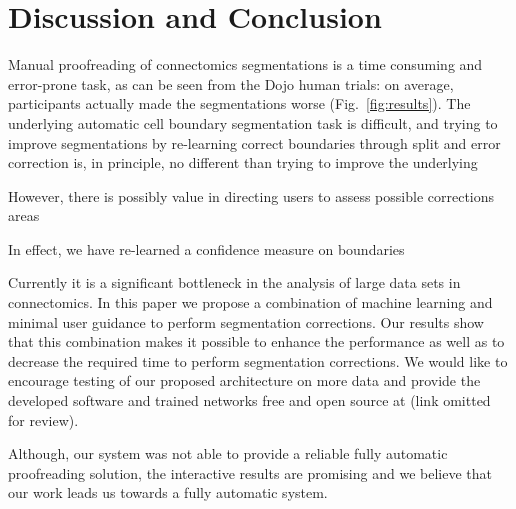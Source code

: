 \section{Discussion and Conclusion}

Manual proofreading of connectomics segmentations is a time consuming and error-prone task, as can be seen from the Dojo human trials: on average, participants actually made the segmentations worse (Fig.~\ref{fig:results}). The underlying automatic cell boundary segmentation task is difficult, and trying to improve segmentations by re-learning correct boundaries through split and error correction is, in principle, no different than trying to improve the underlying 

However, there is possibly value in directing users to assess possible corrections areas

In effect, we have re-learned a confidence measure on boundaries 


Currently it is a significant bottleneck in the analysis of large data sets in connectomics. In this paper we propose a combination of machine learning and minimal user guidance to perform segmentation corrections. Our results show that this combination makes it possible to enhance the performance as well as to decrease the required time to perform segmentation corrections. We would like to encourage testing of our proposed architecture on more data and provide the developed software and trained networks free and open source at (link omitted for review).%

Although, our system was not able to provide a reliable fully automatic proofreading solution, the interactive results are promising and we believe that our work leads us towards a fully automatic system. 




